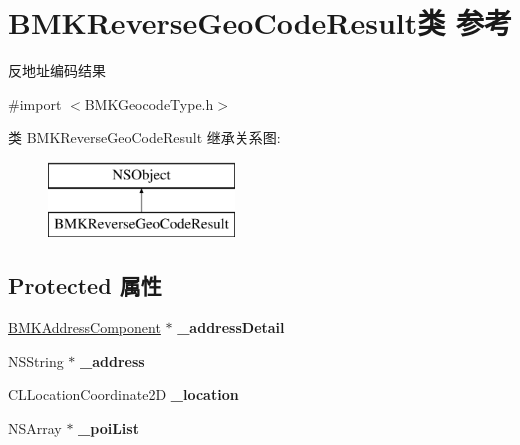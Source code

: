 \hypertarget{interface_b_m_k_reverse_geo_code_result}{\section{B\+M\+K\+Reverse\+Geo\+Code\+Result类 参考}
\label{interface_b_m_k_reverse_geo_code_result}
}


反地址编码结果  




{\ttfamily \#import $<$B\+M\+K\+Geocode\+Type.\+h$>$}

类 B\+M\+K\+Reverse\+Geo\+Code\+Result 继承关系图\+:\begin{figure}[H]
\begin{center}
\leavevmode
\includegraphics[height=2.000000cm]{interface_b_m_k_reverse_geo_code_result}
\end{center}
\end{figure}
\subsection*{Protected 属性}
\begin{DoxyCompactItemize}
\item 
\hypertarget{interface_b_m_k_reverse_geo_code_result_a608c763c37e9f692c21284f6983666ee}{\hyperlink{interface_b_m_k_address_component}{B\+M\+K\+Address\+Component} $\ast$ {\bfseries \+\_\+address\+Detail}}\label{interface_b_m_k_reverse_geo_code_result_a608c763c37e9f692c21284f6983666ee}

\item 
\hypertarget{interface_b_m_k_reverse_geo_code_result_aaf0a6e9ae4f26fad365f95228cd019ad}{N\+S\+String $\ast$ {\bfseries \+\_\+address}}\label{interface_b_m_k_reverse_geo_code_result_aaf0a6e9ae4f26fad365f95228cd019ad}

\item 
\hypertarget{interface_b_m_k_reverse_geo_code_result_a879089700a14cf97e5f408dbeb453b82}{C\+L\+Location\+Coordinate2\+D {\bfseries \+\_\+location}}\label{interface_b_m_k_reverse_geo_code_result_a879089700a14cf97e5f408dbeb453b82}

\item 
\hypertarget{interface_b_m_k_reverse_geo_code_result_acc26e3e65250883c34ad4a7f71225441}{N\+S\+Array $\ast$ {\bfseries \+\_\+poi\+List}}\label{interface_b_m_k_reverse_geo_code_result_acc26e3e65250883c34ad4a7f71225441}

\end{DoxyCompactItemize}
